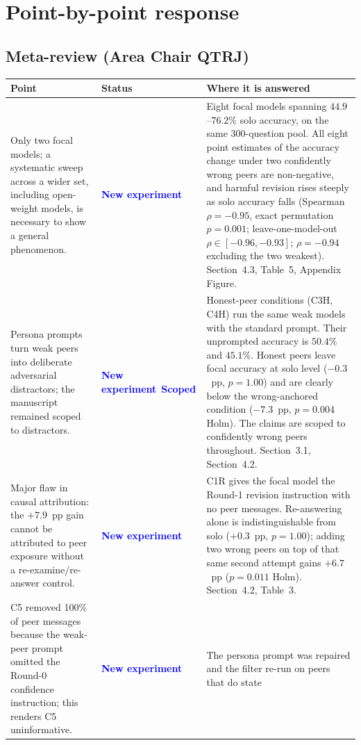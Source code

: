 \documentclass[11pt]{article}
\newcommand{\newexp}{\textcolor{blue}{\textbf{New experiment}}}
\newcommand{\scoped}{\textcolor{blue}{\textbf{Scoped}}}
\begin{document}
\clearpage
\section*{Point-by-point response}

\subsection*{Meta-review (Area Chair QTRJ)}

\begin{longtable}{@{}p{}p{}p{}@{}}
\toprule
\textbf{Point} & \textbf{Status} & \textbf{Where it is answered} \\
\midrule
\endhead
Only two focal models; a systematic sweep across a wider set, including
open-weight models, is necessary to show a general phenomenon.
& \newexp
& Eight focal models spanning $44.9$--$76.2\%$ solo accuracy, on the same
  300-question pool. All eight point estimates of the accuracy change under two
  confidently wrong peers are non-negative, and harmful revision rises steeply
  as solo accuracy falls (Spearman $\rho=-0.95$, exact permutation $p=0.001$;
  leave-one-model-out $\rho\in[-0.96,-0.93]$; $\rho=-0.94$ excluding the two
  weakest). Section~4.3, Table~5, Appendix Figure. \\
\addlinespace
Persona prompts turn weak peers into deliberate adversarial distractors;
the manuscript remained scoped to distractors.
& \newexp\ \scoped
& Honest-peer conditions (C3H, C4H) run the same weak models with the standard
  prompt. Their unprompted accuracy is $50.4\%$ and $45.1\%$. Honest peers leave
  focal accuracy at solo level ($-0.3$~pp, $p=1.00$) and are clearly below the
  wrong-anchored condition ($-7.3$~pp, $p=0.004$ Holm). The claims are scoped to
  confidently wrong peers throughout. Section~3.1, Section~4.2. \\
\addlinespace
Major flaw in causal attribution: the $+7.9$~pp gain cannot be attributed to
peer exposure without a re-examine/re-answer control.
& \newexp
& C1R gives the focal model the Round-1 revision instruction with no peer
  messages. Re-answering alone is indistinguishable from solo
  ($+0.3$~pp, $p=1.00$); adding two wrong peers on top of that same second
  attempt gains $+6.7$~pp ($p=0.011$ Holm). Section~4.2, Table~3. \\
\addlinespace
C5 removed 100\% of peer messages because the weak-peer prompt omitted the
Round-0 confidence instruction; this renders C5 uninformative.
& \newexp
& The persona prompt was repaired and the filter re-run on peers that do state

\end{longtable}
\end{document}
